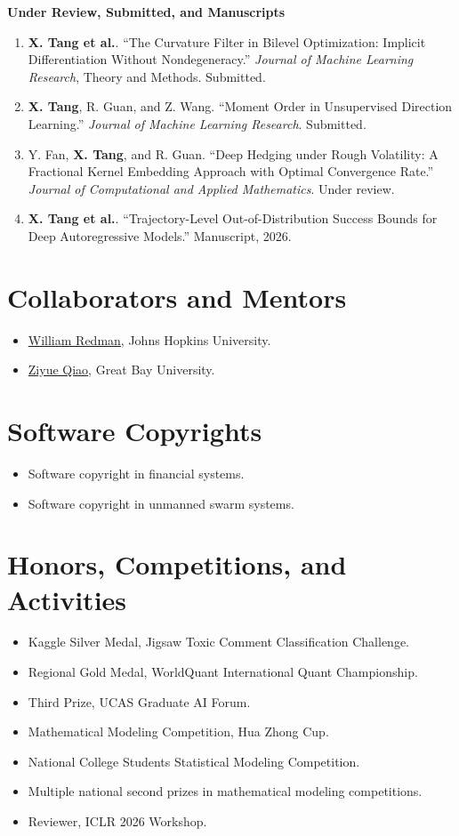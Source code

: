 \documentclass[9pt,letterpaper]{extarticle}
\newcommand{\paper}[2]{\item #1. ``#2.''}
\begin{document}
\textbf{Under Review, Submitted, and Manuscripts}
\begin{enumerate}
  \paper{\textbf{X. Tang et al.}}{The Curvature Filter in Bilevel Optimization: Implicit Differentiation Without Nondegeneracy} \emph{Journal of Machine Learning Research}, Theory and Methods. Submitted.
  \paper{\textbf{X. Tang}, R. Guan, and Z. Wang}{Moment Order in Unsupervised Direction Learning} \emph{Journal of Machine Learning Research}. Submitted.
  \paper{Y. Fan, \textbf{X. Tang}, and R. Guan}{Deep Hedging under Rough Volatility: A Fractional Kernel Embedding Approach with Optimal Convergence Rate} \emph{Journal of Computational and Applied Mathematics}. Under review.
  \paper{\textbf{X. Tang et al.}}{Trajectory-Level Out-of-Distribution Success Bounds for Deep Autoregressive Models} Manuscript, 2026.
\end{enumerate}

\section{Collaborators and Mentors}
\begin{itemize}
  \item \href{https://engineering.jhu.edu/faculty/william-redman/}{William Redman}, Johns Hopkins University.
  \item \href{https://qiaoziyue.com/}{Ziyue Qiao}, Great Bay University.
\end{itemize}

\section{Software Copyrights}
\begin{itemize}
  \item Software copyright in financial systems.
  \item Software copyright in unmanned swarm systems.
\end{itemize}

\section{Honors, Competitions, and Activities}
\begin{itemize}
  \item Kaggle Silver Medal, Jigsaw Toxic Comment Classification Challenge.
  \item Regional Gold Medal, WorldQuant International Quant Championship.
  \item Third Prize, UCAS Graduate AI Forum.
  \item Mathematical Modeling Competition, Hua Zhong Cup.
  \item National College Students Statistical Modeling Competition.
  \item Multiple national second prizes in mathematical modeling competitions.
  \item Reviewer, ICLR 2026 Workshop.
\end{itemize}
\end{document}
